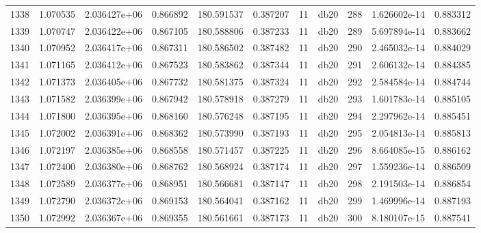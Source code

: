 \begin{tabular}{lrrrrrrlrrr}
1338 &    1.070535 &        2.036427e+06 &  0.866892 &              180.591537 &    0.387207 &      11 &         db20 &    288 &   1.626602e-14 &      0.883312 \\
1339 &    1.070747 &        2.036422e+06 &  0.867105 &              180.588806 &    0.387233 &      11 &         db20 &    289 &   5.697894e-14 &      0.883662 \\
1340 &    1.070952 &        2.036417e+06 &  0.867311 &              180.586502 &    0.387482 &      11 &         db20 &    290 &   2.465032e-14 &      0.884029 \\
1341 &    1.071165 &        2.036412e+06 &  0.867523 &              180.583862 &    0.387344 &      11 &         db20 &    291 &   2.606132e-14 &      0.884385 \\
1342 &    1.071373 &        2.036405e+06 &  0.867732 &              180.581375 &    0.387324 &      11 &         db20 &    292 &   2.584584e-14 &      0.884744 \\
1343 &    1.071582 &        2.036399e+06 &  0.867942 &              180.578918 &    0.387279 &      11 &         db20 &    293 &   1.601783e-14 &      0.885105 \\
1344 &    1.071800 &        2.036395e+06 &  0.868160 &              180.576248 &    0.387195 &      11 &         db20 &    294 &   2.297962e-14 &      0.885451 \\
1345 &    1.072002 &        2.036391e+06 &  0.868362 &              180.573990 &    0.387193 &      11 &         db20 &    295 &   2.054813e-14 &      0.885813 \\
1346 &    1.072197 &        2.036385e+06 &  0.868558 &              180.571457 &    0.387225 &      11 &         db20 &    296 &   8.664085e-15 &      0.886162 \\
1347 &    1.072400 &        2.036380e+06 &  0.868762 &              180.568924 &    0.387174 &      11 &         db20 &    297 &   1.559236e-14 &      0.886509 \\
1348 &    1.072589 &        2.036377e+06 &  0.868951 &              180.566681 &    0.387147 &      11 &         db20 &    298 &   2.191503e-14 &      0.886854 \\
1349 &    1.072790 &        2.036372e+06 &  0.869153 &              180.564041 &    0.387162 &      11 &         db20 &    299 &   1.469996e-14 &      0.887193 \\
1350 &    1.072992 &        2.036367e+06 &  0.869355 &              180.561661 &    0.387173 &      11 &         db20 &    300 &   8.180107e-15 &      0.887541 \\

\end{tabular}
